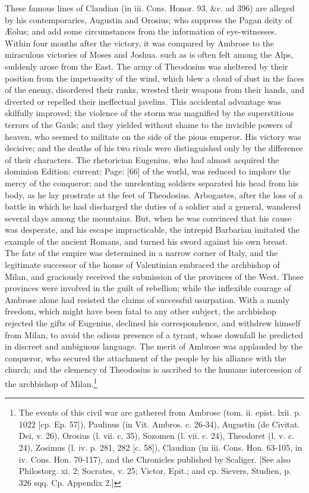 {These famous lines of Claudian (in iii. Cons. Honor. 93, \&c. ad 396) are alleged by his contemporaries, Augustin and Orosius; who suppress the Pagan deity of Æolus; and add some circumstances from the information of eye-witnesses. Within four months after the victory, it was compared by Ambrose to the miraculous victories of Moses and Joshua.} such as is often felt among the Alps, suddenly arose from the East. The army of Theodosius was sheltered by their position from the impetuosity of the wind, which blew a cloud of dust in the faces of the enemy, disordered their ranks, wrested their weapons from their hands, and diverted or repelled their ineffectual javelins. This accidental advantage was skilfully improved; the violence of the storm was magnified by the superstitious terrors of the Gauls; and they yielded without shame to the invisible powers of heaven, who seemed to militate on the side of the pious emperor. His victory was decisive; and the deaths of his two rivals were distinguished only by the difference of their characters. The rhetorician Eugenius, who had almost acquired the dominion Edition: current; Page: [66] of the world, was reduced to implore the mercy of the conqueror; and the unrelenting soldiers separated his head from his body, as he lay prostrate at the feet of Theodosius. Arbogastes, after the loss of a battle in which he had discharged the duties of a soldier and a general, wandered several days among the mountains. But, when he was convinced that his cause was desperate, and his escape impracticable, the intrepid Barbarian imitated the example of the ancient Romans, and turned his sword against his own breast. The fate of the empire was determined in a narrow corner of Italy, and the legitimate successor of the house of Valentinian embraced the archbishop of Milan, and graciously received the submission of the provinces of the West. Those provinces were involved in the guilt of rebellion; while the inflexible courage of Ambrose alone had resisted the claims of successful usurpation. With a manly freedom, which might have been fatal to any other subject, the archbishop rejected the gifts of Eugenius, declined his correspondence, and withdrew himself from Milan, to avoid the odious presence of a tyrant, whose downfall he predicted in discreet and ambiguous language. The merit of Ambrose was applauded by the conqueror, who secured the attachment of the people by his alliance with the church; and the clemency of Theodosius is ascribed to the humane intercession of the archbishop of Milan.\footnote{The events of this civil war are gathered from Ambrose (tom. ii. epist. lxii. p. 1022 [cp. Ep. 57]), Paulinus (in Vit. Ambros. c. 26-34), Augustin (de Civitat. Dei, v. 26), Orosius (l. vii. c. 35), Sozomen (l. vii. c. 24), Theodoret (l. v. c. 24), Zosimus (l. iv. p. 281, 282 [c. 58]), Claudian (in iii. Cons. Hon. 63-105, in iv. Cons. Hon. 70-117), and the Chronicles published by Scaliger. [See also Philostorg. xi. 2; Socrates, v. 25; Victor, Epit.; and cp. Sievers, Studien, p. 326 sqq. Cp. Appendix 2.]}


